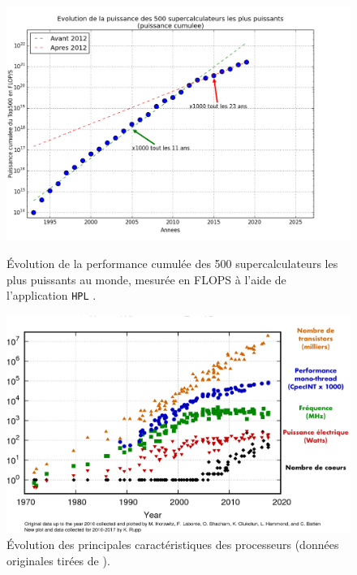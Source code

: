         \begin{figure}[hb!]
            \centering
            \includegraphics[width=13cm]{images/top500_evolution.png}
            \caption{\label{fig:top500_evolution_intro} Évolution de la performance cumulée des 500 supercalculateurs les plus puissants au monde, mesurée en \gls{FLOPS} à l'aide de l'application \texttt{HPL} \cite{Dongarra2003}.}

            \vspace*{\floatsep}%

            \includegraphics[width=13cm]{images/evo_proc.png}
            \caption{\label{fig:evo_cpu1} Évolution des principales caractéristiques des processeurs (données originales tirées de \cite{rupp40years}\protect\footnotemark).}
        \end{figure}
        

